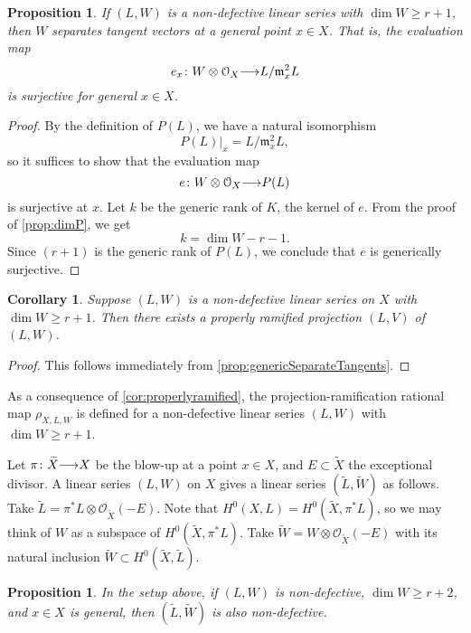 \documentclass[11pt,reqno]{amsart}
\theoremstyle{plain}
\newtheorem{proposition}[theorem]{Proposition}
\newtheorem{corollary}[theorem]{Corollary}
\theoremstyle{definition}
\theoremstyle{remark}
\numberwithin{equation}{section}
\renewcommand{\to}{{\longrightarrow}}
\numberwithin{equation}{section}
\renewcommand{\O}{\mathcal O}
\begin{document}
\begin{proposition}
  \label{prop:genericSeparateTangents}
  If $(L, W)$ is a non-defective linear series with $\dim W \geq r+1$, then $W$ separates tangent vectors at a general point $x \in X$.
  That is, the evaluation map
  \[e_{x}\from W \otimes \O_X \to L/\mathfrak m_x^2 L\]
  is surjective for general $x \in X$.
\end{proposition}
\begin{proof}
  By the definition of $P(L)$, we have a natural isomorphism
  \[ P(L)|_x = L/\mathfrak m_x^2 L,\]
  so it suffices to show that the evaluation map
  \[ e \from W \otimes \O_X \to P(L)\]
  is surjective at $x$.
  Let $k$ be the generic rank of $K$, the kernel of $e$.
  From the proof of \autoref{prop:dimP}, we get
  \[  k = \dim W - r - 1.\]
  Since $(r+1)$ is the generic rank of $P(L)$, we conclude that $e$ is generically surjective.
\end{proof}
\begin{corollary}\label{cor:properlyramified}
  Suppose $(L, W)$ is a non-defective linear series on $X$ with $\dim W \geq r+1$.
  Then there exists a properly ramified projection $(L,V)$ of $(L, W)$.
\end{corollary}
\begin{proof}
  This follows immediately from \autoref{prop:genericSeparateTangents}.
\end{proof}
As a consequence of \autoref{cor:properlyramified}, the projection-ramification rational map $\rho_{X,L, W}$ is defined for a non-defective linear series $(L, W)$ with $\dim W \geq r+1$.

Let $\pi \from \widetilde X \to X$ be the blow-up at a point $x \in X$, and $E \subset \widetilde X$ the exceptional divisor.
A linear series $(L, W)$ on $X$ gives a linear series $(\widetilde L, \widetilde W)$ as follows.
Take $\widetilde L = \pi^* L \otimes \O_{\widetilde X}(-E)$.
Note that $H^0(X, L) = H^0(\widetilde X, \pi^*L)$, so we may think of $W$ as a subspace of $H^0(\widetilde X, \pi^*L)$.
Take $\widetilde W = W \otimes \O_{\widetilde X}(-E)$ with its natural inclusion $\widetilde W \subset H^0(\widetilde X, \widetilde L)$.
\begin{proposition}
  \label{prop:blowuppoint}
  In the setup above, if $(L, W)$ is non-defective, $\dim W \geq r+2$, and $x \in X$ is general, then $(\widetilde L, \widetilde W)$ is also non-defective.
\end{proposition}
\end{document}
